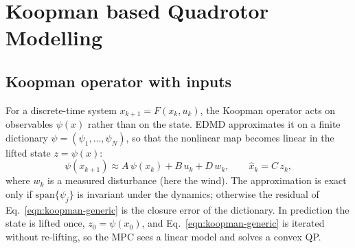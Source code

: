 \documentclass[11pt,a4paper]{article}
\newcommand{\KRes}{\textsf{K-Res}}            %
\newcommand{\KFull}{\textsf{K-Full}}          %
\newcommand{\KResMPC}{\textsf{K-Res-MPC}}     %
\newcommand{\KFullMPC}{\textsf{K-Full-MPC}}   %
\begin{document}
	
	\section{Koopman based Quadrotor Modelling}
	\label{sec:koopman}

	\subsection{Koopman operator with inputs}
	For a discrete-time system $x_{k+1} = F(x_k, u_k)$, the Koopman operator acts on observables
	$\psi(x)$ rather than on the state. EDMD approximates it on a finite dictionary
	$\psi = (\psi_1, \dots, \psi_N)$, so that the nonlinear map becomes linear in the lifted state
	$z = \psi(x)$:
	\begin{equation}
		\psi(x_{k+1}) \approx A\,\psi(x_k) + B\,u_k + D\,w_k,
		\qquad \hat{x}_k = C\,z_k,
		\label{eqn:koopman-generic}
	\end{equation}
	where $w_k$ is a measured disturbance (here the wind). The approximation is exact only if
	$\mathrm{span}\{\psi_j\}$ is invariant under the dynamics; otherwise the residual of
	Eq.~\ref{eqn:koopman-generic} is the closure error of the dictionary. In prediction the
	state is lifted once, $z_0 = \psi(x_0)$, and Eq.~\ref{eqn:koopman-generic} is iterated
	without re-lifting, so the MPC sees a linear model and solves a convex QP.

\end{document}
